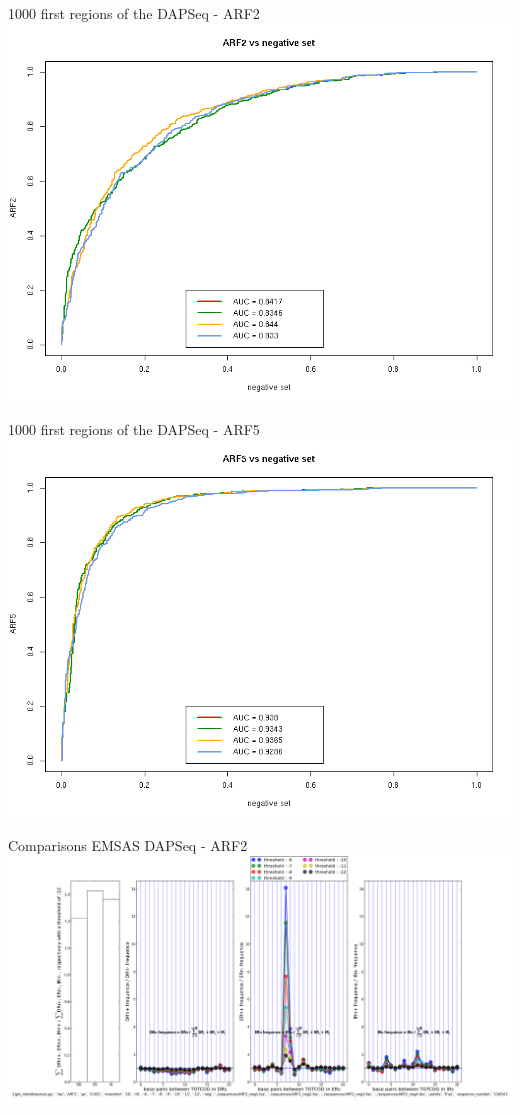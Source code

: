 \documentclass{beamer}
\begin{document}
\begin{frame}{1000 first regions of the DAPSeq - ARF2}
  \includegraphics[width=1\textwidth,height=0.8\textheight,center]{ROC_ARF2_negative_set.png}
\end{frame}

\begin{frame}{1000 first regions of the DAPSeq - ARF5}
  \includegraphics[width=1\textwidth,height=0.8\textheight,center]{ROC_ARF5_negative_set.png}
\end{frame}

\begin{frame}{Comparisons EMSAS DAPSeq - ARF2}
  \includegraphics[width=1\textwidth,height=0.8\textheight,center]{ARF2_interdistances_-6-7-8-9-10-11-12_points_4Neg.png}
\end{frame}
\end{document}
